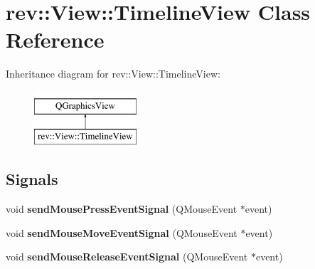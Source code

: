 \hypertarget{classrev_1_1_view_1_1_timeline_view}{}\section{rev\+::View\+::Timeline\+View Class Reference}
\label{classrev_1_1_view_1_1_timeline_view}
Inheritance diagram for rev\+::View\+::Timeline\+View\+:\begin{figure}[H]
\begin{center}
\leavevmode
\includegraphics[height=2.000000cm]{classrev_1_1_view_1_1_timeline_view}
\end{center}
\end{figure}
\subsection*{Signals}
\begin{DoxyCompactItemize}
\item 
\mbox{\label{classrev_1_1_view_1_1_timeline_view_a4f9993dc03978ea894c436d17fc09fec}} 
void {\bfseries send\+Mouse\+Press\+Event\+Signal} (Q\+Mouse\+Event $\ast$event)
\item 
\mbox{\label{classrev_1_1_view_1_1_timeline_view_a5a6014bbc2705e46fcb4b3910a281f9f}} 
void {\bfseries send\+Mouse\+Move\+Event\+Signal} (Q\+Mouse\+Event $\ast$event)
\item 
\mbox{\label{classrev_1_1_view_1_1_timeline_view_a410b3cc15c3ace8d313caee08b397a21}} 
void {\bfseries send\+Mouse\+Release\+Event\+Signal} (Q\+Mouse\+Event $\ast$event)
\end{DoxyCompactItemize}
